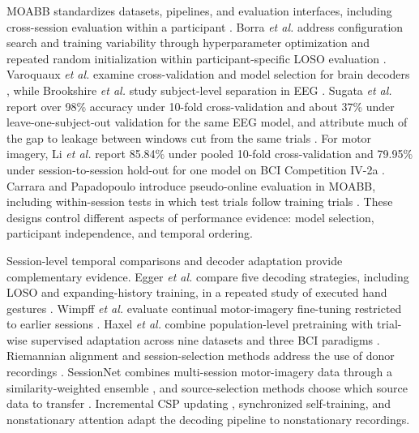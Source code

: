 \documentclass{ieeeaccess}
\begin{document}
MOABB standardizes datasets, pipelines, and evaluation interfaces, including
cross-session evaluation within a participant \cite{jayaram2018moabb}.
Borra \emph{et al.} address configuration search and training variability
through hyperparameter optimization and repeated random initialization within
participant-specific LOSO evaluation \cite{borra2025trustworthy}.
Varoquaux \emph{et al.} examine cross-validation and model selection for brain
decoders \cite{varoquaux2017assessing}, while Brookshire \emph{et al.} study
subject-level separation in EEG \cite{brookshire2024leakage}. Sugata
\emph{et al.} report over 98\% accuracy under 10-fold cross-validation and about
37\% under leave-one-subject-out validation for the same EEG model, and attribute
much of the gap to leakage between windows cut from the same trials
\cite{sugata2026fear}. For motor imagery, Li \emph{et al.} report 85.84\% under
pooled 10-fold cross-validation and 79.95\% under session-to-session hold-out for
one model on BCI Competition IV-2a \cite{li2026fbda}.
Carrara and Papadopoulo introduce pseudo-online evaluation in MOABB, including
within-session tests in which test trials follow training trials
\cite{carrara2024pseudoonline}. These designs control different aspects of
performance evidence: model selection, participant independence, and temporal
ordering.

Session-level temporal comparisons and decoder adaptation provide complementary
evidence. Egger \emph{et al.} compare five decoding strategies, including LOSO
and expanding-history training, in a repeated study of executed hand gestures
\cite{egger2024chrono}. Wimpff \emph{et al.} evaluate continual motor-imagery
fine-tuning restricted to earlier sessions \cite{wimpff2025continual}.
Haxel \emph{et al.} combine population-level pretraining with trial-wise
supervised adaptation across nine datasets and three BCI paradigms
\cite{haxel2026edapt}. Riemannian alignment and session-selection methods
address the use of donor recordings
\cite{zanini2018transfer,sung2024sessiontransfer,shen2026confidence}.
SessionNet combines multi-session motor-imagery data through a
similarity-weighted ensemble \cite{lee2020sessionnet}, and source-selection
methods choose which source data to transfer \cite{heskebeck2026source}.
Incremental CSP updating \cite{jiang2020adaptivecsp}, synchronized
self-training, and nonstationary attention
\cite{chen2025synchronized,guo2025crosssession} adapt the decoding pipeline to
nonstationary recordings.
\end{document}

